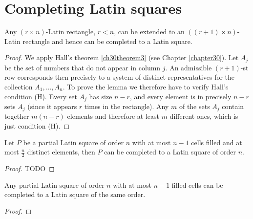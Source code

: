 \chapter{Completing Latin squares}

\begin{lemma}
  \label{ch36lemma1}
  Any $(r \times n)$-Latin rectangle, $r < n$, can be extended to an $((r+1) \times n)$-Latin
  rectangle and hence can be completed to a Latin square.
\end{lemma}
\begin{proof}
  We apply Hall's theorem \ref{ch30theorem3} (see Chapter \ref{chapter30}). Let $A_j$ be the set of numbers that do
  not appear in column $j$. An admissible $(r+1)$-st row corresponds then precisely to a system of
  distinct representatives for the collection $A_1, \dots, A_n$. To prove the lemma we
  therefore have to verify Hall's condition (H). Every set $A_j$ has size $n - r$, and every
  element is in precisely $n - r$ sets $A_j$ (since it appears $r$ times in the rectangle).
  Any $m$ of the sets $A_j$ contain together $m(n - r)$ elements and therefore at least $m$
  different ones, which is just condition (H).
\end{proof}

\begin{lemma}
  \label{ch36lemma2}
  Let $P$ be a partial Latin square of order $n$ with at most $n - 1$ cells filled and at
  most $\frac{n}{2}$ distinct elements, then $P$ can be completed to a Latin square of
  order $n$.
\end{lemma}
\begin{proof}
  TODO
\end{proof}


\begin{theorem}
  \label{smetaniuk_theorem}
  Any partial Latin square of order $n$ with at most $n - 1$ filled cells can be completed to a
  Latin square of the same order.
\end{theorem}
\begin{proof}
\end{proof}
